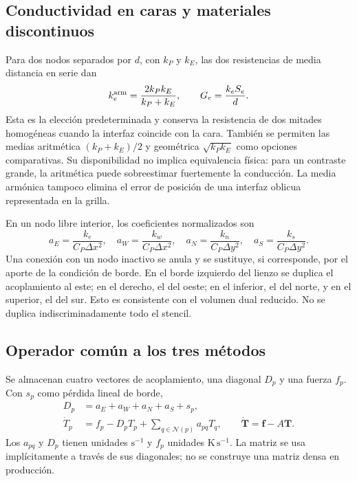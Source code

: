\documentclass[11pt,a4paper]{article}
\begin{document}
\subsection{Conductividad en caras y materiales discontinuos}
Para dos nodos separados por $d$, con $k_P$ y $k_E$, las dos resistencias de
media distancia en serie dan
\begin{equation}
 k_e^{\rm arm}=\frac{2k_Pk_E}{k_P+k_E},\qquad
 G_e=\frac{k_e S_e}{d}.
 \label{eq:harmonic}
\end{equation}
Esta es la elección predeterminada y conserva la resistencia de dos mitades
homogéneas cuando la interfaz coincide con la cara. También se permiten las
medias aritmética $(k_P+k_E)/2$ y geométrica $\sqrt{k_Pk_E}$ como opciones
comparativas. Su disponibilidad no implica equivalencia física: para un
contraste grande, la aritmética puede sobreestimar fuertemente la conducción.
La media armónica tampoco elimina el error de posición de una interfaz
oblicua representada en la grilla.

En un nodo libre interior, los coeficientes normalizados son
\begin{equation}
 a_E=\frac{k_e}{C_P\Delta x^2},\quad
 a_W=\frac{k_w}{C_P\Delta x^2},\quad
 a_N=\frac{k_n}{C_P\Delta y^2},\quad
 a_S=\frac{k_s}{C_P\Delta y^2}.
\end{equation}
Una conexión con un nodo inactivo se anula y se sustituye, si corresponde,
por el aporte de la condición de borde. En el borde izquierdo del lienzo se
duplica el acoplamiento al este; en el derecho, el del oeste; en el inferior,
el del norte, y en el superior, el del sur. Esto es consistente con el volumen
dual reducido. No se duplica indiscriminadamente todo el stencil.

\subsection{Operador común a los tres métodos}
Se almacenan cuatro vectores de acoplamiento, una diagonal $D_p$ y una fuerza
$f_p$. Con $s_p$ como pérdida lineal de borde,
\begin{align}
 D_p&=a_E+a_W+a_N+a_S+s_p,\\
 \dot T_p&=f_p-D_pT_p+\sum_{q\in\mathcal N(p)}a_{pq}T_q,
 \qquad \dot{\boldsymbol T}=\boldsymbol f-A\boldsymbol T.
 \label{eq:operator}
\end{align}
Los $a_{pq}$ y $D_p$ tienen unidades $\mathrm{s^{-1}}$ y $f_p$ unidades
$\mathrm{K\,s^{-1}}$. La matriz se usa implícitamente a través de sus diagonales;
no se construye una matriz densa en producción.
\end{document}
